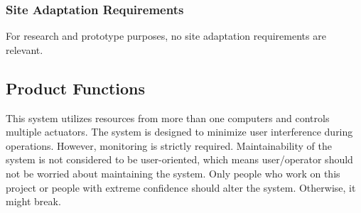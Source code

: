 \documentclass[compsoc,draftclsnofoot,onecolumn,10pt]{IEEEtran}
\begin{document}
\subsubsection{Site Adaptation Requirements}
For research and prototype purposes, no site adaptation requirements are relevant. 

\subsection{Product Functions} %
This system utilizes resources from more than one computers and controls multiple
actuators. The system is designed to minimize user interference during operations.
However, monitoring is strictly required. 
Maintainability of the system is not considered to be user-oriented, which means 
user/operator should not be worried about maintaining the system. Only people who 
work on this project or people with extreme confidence should alter the 
system. Otherwise, it might break. 
%
\end{document}
